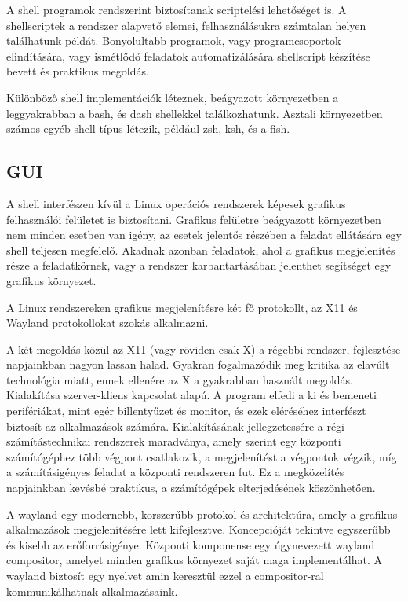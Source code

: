 A shell programok rendszerint biztosítanak scriptelési lehetőséget is. A
shellscriptek a rendszer alapvető elemei, felhasználásukra számtalan helyen
találhatunk példát. Bonyolultabb programok, vagy programcsoportok elindítására,
vagy ismétlődő feladatok automatizálására shellscript készítése bevett és
praktikus megoldás.

Különböző shell implementációk léteznek, beágyazott környezetben a leggyakrabban
a bash, és dash shellekkel találkozhatunk. Asztali környezetben számos egyéb
shell típus létezik, például zsh, ksh, és a fish.

\subsection{GUI}

A shell interfészen kívül a Linux operációs rendszerek képesek grafikus
felhasználói felületet is biztosítani. Grafikus felületre beágyazott környezetben
nem minden esetben van igény, az esetek jelentős részében a feladat ellátására
egy shell teljesen megfelelő. Akadnak azonban feladatok, ahol a grafikus
megjelenítés része a feladatkörnek, vagy a rendszer karbantartásában jelenthet
segítséget egy grafikus környezet.

\medskip

A Linux rendszereken grafikus megjelenítésre két fő protokollt, az X11 és Wayland
protokollokat szokás alkalmazni.

A két megoldás közül az X11 (vagy röviden csak X) a régebbi rendszer, fejlesztése
napjainkban nagyon lassan halad. Gyakran fogalmazódik meg kritika az elavúlt
technológia miatt, ennek ellenére az X a gyakrabban használt megoldás.
Kialakítása szerver-kliens kapcsolat alapú.  A program elfedi a ki és bemeneti
perifériákat, mint egér billentyűzet és monitor, és ezek eléréséhez interfészt
biztosít az alkalmazások számára.  Kialakításának jellegzetessére a régi
számítástechnikai rendszerek maradványa, amely szerint egy központi számítógéphez
több végpont csatlakozik, a megjelenítést a végpontok végzik, míg a
számításigényes feladat a központi rendszeren fut. Ez a megközelítés napjainkban
kevésbé praktikus, a számítógépek elterjedésének köszönhetően.

A wayland egy modernebb, korszerűbb protokol és architektúra, amely a grafikus
alkalmazások megjelenítésére lett kifejlesztve. Koncepcióját tekintve egyszerűbb
és kisebb az erőforrásigénye. Központi komponense egy úgynevezett wayland
compositor, amelyet minden grafikus környezet saját maga implementálhat. A
wayland biztosít egy nyelvet amin keresztül ezzel a compositor-ral
kommunikálhatnak alkalmazásaink.

